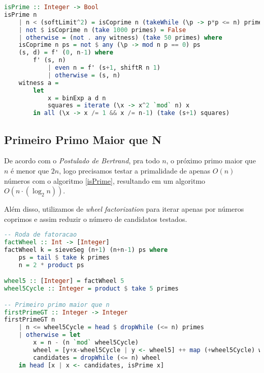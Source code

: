 \documentclass{article}
\begin{document}
\noindent\hspace{0.03\linewidth}
\begin{minipage}{0.9\linewidth}
\begin{lstlisting}[language=haskell,caption=Miller-Rabin]
isPrime :: Integer -> Bool
isPrime n
    | n < (softLimit^2) = isCoprime n (takeWhile (\p -> p*p <= n) primes)
    | not $ isCoprime n (take 1000 primes) = False
    | otherwise = (not . any witness) (take 50 primes) where
    isCoprime n ps = not $ any (\p -> mod n p == 0) ps
    (s, d) = f' (0, n-1) where
        f' (s, n)
            | even n = f' (s+1, shiftR n 1)
            | otherwise = (s, n)
    witness a =
        let
            x = binExp a d n
            squares = iterate (\x -> x^2 `mod` n) x
        in all (\x -> x /= 1 && x /= n-1) (take (s+1) squares)
\end{lstlisting}
\end{minipage}

\subsection{Primeiro Primo Maior que N}

De acordo com o \textit{Postulado de Bertrand}, pra todo $n$, o próximo primo maior que $n$ é menor que $2n$, logo precisamos testar a primalidade de apenas $O(n)$ números com o algoritmo \ref{isPrime}, resultando em um algoritmo $O(n\cdot (\log_2 n))$.

Além disso, utilizamos de \textit{wheel factorization} para iterar apenas por números coprimos e assim reduzir o número de candidatos testados.


\noindent\hspace{0.03\linewidth}
\begin{minipage}{0.9\linewidth}
\begin{lstlisting}[language=haskell,caption=Wheel Factorization e Primeiro Primo Maior que N]
-- Roda de fatoracao
factWheel :: Int -> [Integer]
factWheel k = sieveSeg (n+1) (n+n-1) ps where
    ps = tail $ take k primes
    n = 2 * product ps

wheel5 :: [Integer] = factWheel 5
wheel5Cycle :: Integer = product $ take 5 primes

-- Primeiro primo maior que n
firstPrimeGT :: Integer -> Integer
firstPrimeGT n
    | n <= wheel5Cycle = head $ dropWhile (<= n) primes
    | otherwise = let
        x = n - (n `mod` wheel5Cycle)
        wheel = [y+x-wheel5Cycle | y <- wheel5] ++ map (+wheel5Cycle) wheel
        candidates = dropWhile (<= n) wheel
    in head [x | x <- candidates, isPrime x]

\end{lstlisting}
\end{minipage}
\end{document}
